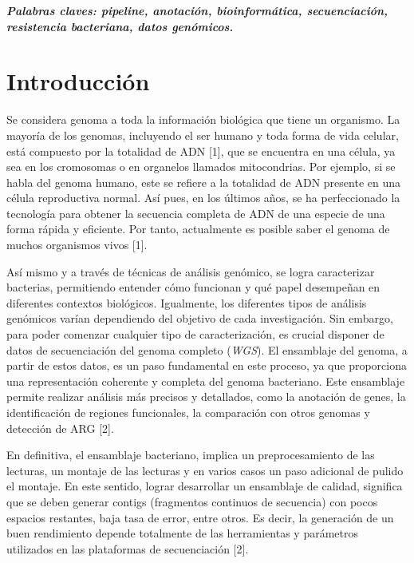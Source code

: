 \documentclass[12pt]{article}
\begin{document}
\vspace{10pt}
\textbf{\emph{Palabras claves: pipeline, anotación, bioinformática, secuenciación, resistencia bacteriana, datos genómicos.}}



\newpage
\section{Introducción}

Se considera genoma a toda la información biológica que tiene un organismo. 
La mayoría de los genomas, incluyendo el ser humano y toda forma de vida celular, 
está compuesto por la totalidad de ADN [1], que se encuentra en una célula, 
ya sea en los cromosomas o en organelos llamados mitocondrias. Por ejemplo, 
si se habla del genoma humano, este se refiere a la totalidad de ADN presente en una 
célula reproductiva normal. Así pues, en los últimos años, se ha perfeccionado la 
tecnología para obtener la secuencia completa de ADN de una especie de una forma rápida 
y eficiente. Por tanto, actualmente es posible saber el genoma de muchos organismos 
vivos [1].

Así mismo y a través de técnicas de análisis genómico, se logra caracterizar 
bacterias, permitiendo entender cómo funcionan y qué papel desempeñan en diferentes 
contextos biológicos. Igualmente, los diferentes tipos de análisis genómicos varían 
dependiendo del objetivo de cada investigación. Sin embargo, para poder comenzar 
cualquier tipo de caracterización, es crucial disponer de datos de secuenciación del
genoma completo (\emph{WGS}). El ensamblaje del genoma, a partir de estos datos, es un paso 
fundamental en este proceso, ya que proporciona una representación coherente y completa 
del genoma bacteriano. Este ensamblaje permite realizar análisis más precisos y 
detallados, como la anotación de genes, la identificación de regiones funcionales, la 
comparación con otros genomas y detección de ARG [2].

En definitiva, el ensamblaje bacteriano, implica un preprocesamiento de las 
lecturas, un montaje de las lecturas y en varios casos un paso adicional de pulido el 
montaje. En este sentido, lograr desarrollar un ensamblaje de calidad, significa que 
se deben generar contigs (fragmentos continuos de secuencia) con pocos espacios restantes, 
baja tasa de error, entre otros. Es decir, la generación de un buen rendimiento depende 
totalmente de las herramientas y parámetros utilizados en las plataformas de 
secuenciación [2]. 
\end{document}
